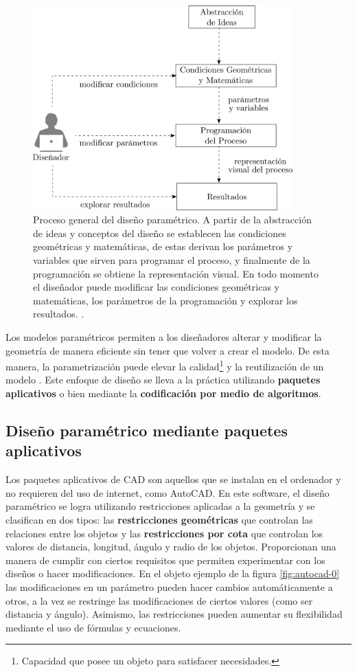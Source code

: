 \begin{figure}[ht]
\includegraphics[width=10cm]{Img/CPD/diseno.png}
\centering
\caption{\footnotesize{Proceso general del diseño paramétrico. A partir de la abstracción de ideas y conceptos del diseño se establecen las condiciones geométricas y matemáticas, de estas derivan los parámetros y variables que sirven para programar el proceso, y finalmente de la programación se obtiene la representación visual. En todo momento el diseñador puede modificar las condiciones geométricas y matemáticas, los parámetros de la programación y explorar los resultados. \citep{bohnacker2012generative}.
}}
\label{fig:procesopar}
\end{figure}

Los modelos paramétricos permiten a los diseñadores alterar y modificar la geometría de manera eficiente sin tener que volver a crear el modelo. De esta manera, la parametrización puede elevar la calidad\footnote{{Capacidad que posee un objeto para satisfacer necesidades.}} y la reutilización de un modelo \citep{Alfaiate2017}. Este enfoque de diseño se lleva a la práctica utilizando  \textbf{paquetes aplicativos} o bien mediante la \textbf{codificación por medio de algoritmos}.

\subsection{Diseño paramétrico mediante paquetes aplicativos}

Los paquetes aplicativos de CAD  son aquellos que se instalan en el ordenador y no requieren del uso de internet, como AutoCAD. En este software, el diseño paramétrico se logra utilizando restricciones aplicadas a la geometría \citep{Autodesk2017} y se clasifican en dos tipos: las \textbf{restricciones geométricas} que controlan las relaciones entre los objetos y las \textbf{restricciones por cota} que controlan los valores de distancia, longitud, ángulo y radio de los objetos. Proporcionan una manera de cumplir con ciertos requisitos que permiten  experimentar con los diseños o hacer modificaciones. En el objeto ejemplo de la figura \ref{fig:autocad-0} las modificaciones en un parámetro pueden hacer cambios automáticamente a otros, a la vez se restringe las modificaciones de ciertos valores (como ser distancia y ángulo). Asimismo, las restricciones pueden aumentar su flexibilidad mediante el uso de fórmulas y ecuaciones.


